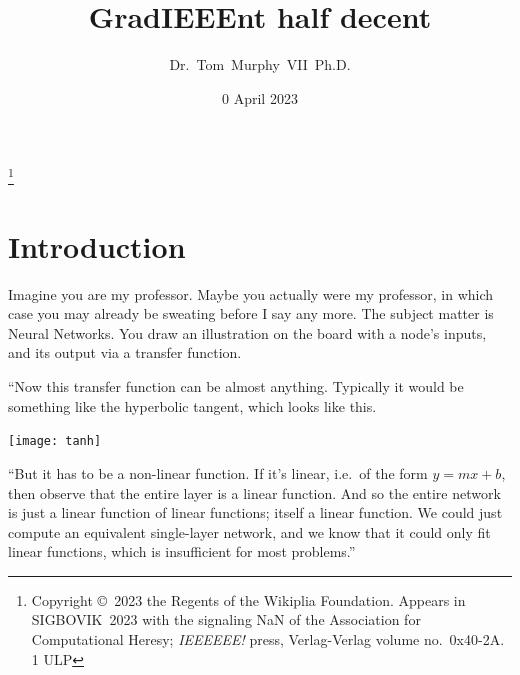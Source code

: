 \documentclass[twocolumn]{article}
\begin{document}
\title{GradIEEEnt half decent}
\author{Dr.~Tom~Murphy~VII~Ph.D.}\thanks{
Copyright \copyright\ 2023 the Regents of the Wikiplia Foundation.
Appears in SIGBOVIK~2023 with the
signaling NaN
of the Association for Computational Heresy; {\em IEEEEEE!}
press, Verlag-Verlag volume no.~0x40-2A. 1 ULP
}

\renewcommand\th{\ensuremath{{}^{\textrm{th}}}}
\newcommand\st{\ensuremath{{}^{\textrm{st}}}}
\newcommand\rd{\ensuremath{{}^{\textrm{rd}}}}
\newcommand\nd{\ensuremath{{}^{\textrm{nd}}}}

\newcommand\gradone{{\sf grad1}}
\newcommand\downshifttwo{{\sf downshift2}}
\newcommand\plussixtyfour{{\sf plus64}}

\renewcommand\paragraph[1]{\smallskip \noindent{\bf #1}\enspace}

\date{0 April 2023}

\maketitle \thispagestyle{empty}

\sloppypar


\section{Introduction}



Imagine you are my professor. Maybe you actually were my professor, in
which case you may already be sweating before I say any more. The
subject matter is Neural Networks. You draw an illustration on the
board with a node's inputs, and its output via a transfer function.

``Now this transfer function can be almost anything. Typically it
would be something like the hyperbolic tangent, which looks like this.

\begin{center}
\texttt{[image: tanh]}
\end{center}

``But it has to be a non-linear function. If it's linear, i.e.~of the
form $y = mx + b$, then observe that the entire layer is a linear
function. And so the entire network is just a linear function of
linear functions; itself a linear function. We could just compute an
equivalent single-layer network, and we know that it could only fit
linear functions, which is insufficient for most problems.''
\end{document}
